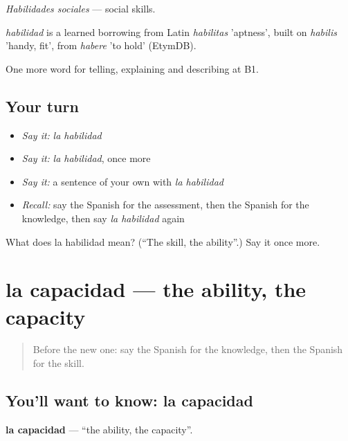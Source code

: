 \emph{Habilidades sociales} — social skills.

\begin{cousinweb}
\emph{habilidad} is a learned borrowing from Latin \emph{habilitas} 'aptness', built on \emph{habilis} 'handy, fit', from \emph{habere} 'to hold' (EtymDB).
\end{cousinweb}

\begin{grammarlens}[title={What you've built}]
One more word for telling, explaining and describing at B1.
\end{grammarlens}

\subsection*{Your turn}
\begin{itemize}
\raggedright
  \item \emph{Say it:} \emph{la habilidad}
  \item \emph{Say it:} \emph{la habilidad}, once more
  \item \emph{Say it:} a sentence of your own with \emph{la habilidad}
  \item \emph{Recall:} say the Spanish for the assessment, then the Spanish for the knowledge, then say \emph{la habilidad} again
\end{itemize}

\begin{tcolorbox}[breakable,colback=teal!4,colframe=teal!35!black,title={Before you move on}]
What does la habilidad mean? (\textquotedblleft{}The skill, the ability\textquotedblright{}.) Say it once more.
\end{tcolorbox}
\section[la capacidad]{la capacidad — the ability, the capacity}

\label{lesson:ES-C598-capacidad}



\begin{quote}
Before the new one: say the Spanish for the knowledge, then the Spanish for the skill.
\end{quote}

\subsection*{You'll want to know: la capacidad}
\textbf{la capacidad} — \textquotedblleft{}the ability, the capacity\textquotedblright{}.

